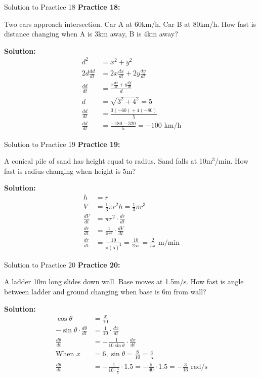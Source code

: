 \documentclass[aspectratio=169]{beamer}
\begin{document}
\begin{frame}{Solution to Practice 18}
\textbf{Practice 18:}

Two cars approach intersection. Car A at 60km/h, Car B at 80km/h. How fast is distance changing when A is 3km away, B is 4km away?

\textbf{Solution:}
\[
\begin{aligned}
  d^2 &= x^2 + y^2 \\
  2d\frac{dd}{dt} &= 2x\frac{dx}{dt} + 2y\frac{dy}{dt} \\
  \frac{dd}{dt} &= \frac{x\frac{dx}{dt} + y\frac{dy}{dt}}{d} \\
  d &= \sqrt{3^2 + 4^2} = 5 \\
  \frac{dd}{dt} &= \frac{3(-60) + 4(-80)}{5} \\
  \frac{dd}{dt} &= \frac{-180 - 320}{5} = -100 \text{ km/h}
\end{aligned}
\]
\end{frame}

\begin{frame}{Solution to Practice 19}
\textbf{Practice 19:}

A conical pile of sand has height equal to radius. Sand falls at 10m$^3$/min. How fast is radius changing when height is 5m?

\textbf{Solution:}
\[
\begin{aligned}
  h &= r \\
  V &= \frac{1}{3}\pi r^2 h = \frac{1}{3}\pi r^3 \\
  \frac{dV}{dt} &= \pi r^2 \cdot \frac{dr}{dt} \\
  \frac{dr}{dt} &= \frac{1}{\pi r^2} \cdot \frac{dV}{dt} \\
  \frac{dr}{dt} &= \frac{10}{\pi(5)^2} = \frac{10}{25\pi} = \frac{2}{5\pi} \text{ m/min}
\end{aligned}
\]
\end{frame}

\begin{frame}{Solution to Practice 20}
\textbf{Practice 20:}

A ladder 10m long slides down wall. Base moves at 1.5m/s. How fast is angle between ladder and ground changing when base is 6m from wall?

\textbf{Solution:}
\[
\begin{aligned}
  \cos\theta &= \frac{x}{10} \\
  -\sin\theta \cdot \frac{d\theta}{dt} &= \frac{1}{10} \cdot \frac{dx}{dt} \\
  \frac{d\theta}{dt} &= -\frac{1}{10\sin\theta} \cdot \frac{dx}{dt} \\
  \text{When } x &= 6, \sin\theta = \frac{8}{10} = \frac{4}{5} \\
  \frac{d\theta}{dt} &= -\frac{1}{10 \cdot \frac{4}{5}} \cdot 1.5 = -\frac{5}{40} \cdot 1.5 = -\frac{3}{16} \text{ rad/s}
\end{aligned}
\]
\end{frame}
\end{document}
